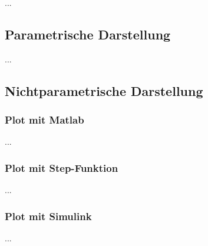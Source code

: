 ...
\subsection{Parametrische Darstellung} %
...
\subsection{Nichtparametrische Darstellung}
\subsubsection{Plot mit Matlab}

...
\subsubsection{Plot mit Step-Funktion}
...
\subsubsection{Plot mit Simulink}
...